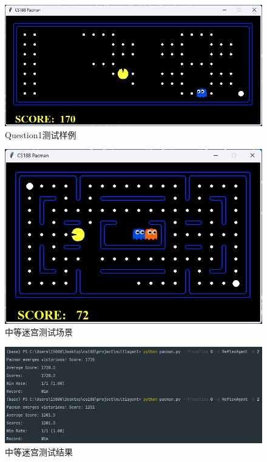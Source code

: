 \begin{figure}[htbp]
    \centering
    \includegraphics[scale = 0.5]{pic/q1test.png}
    \caption{Question1测试样例}\label{q1test}
\end{figure}
\begin{figure}[htbp]
    \centering
    \includegraphics[scale = 0.5]{pic/q1ext.png}
    \caption{中等迷宫测试场景}\label{q1ext}
\end{figure}
\begin{figure}[htbp]
    \centering
    \includegraphics[scale = 0.8]{pic/q1extrst.png}
    \caption{中等迷宫测试结果}\label{q1extrst}
\end{figure}
%
%
